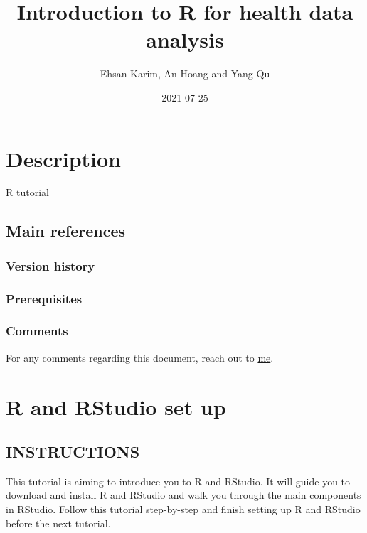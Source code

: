 \documentclass[
]{book}
\title{Introduction to R for health data analysis}
\author{Ehsan Karim, An Hoang and Yang Qu}
\date{2021-07-25}
\begin{document}
\maketitle

{
\setcounter{tocdepth}{1}
\tableofcontents
}
\hypertarget{description}{%
\chapter{Description}\label{description}}

R tutorial

\hypertarget{main-references}{%
\section{Main references}\label{main-references}}

\hypertarget{version-history}{%
\subsection{Version history}\label{version-history}}

\hypertarget{prerequisites}{%
\subsection{Prerequisites}\label{prerequisites}}

\hypertarget{comments}{%
\subsection{Comments}\label{comments}}

For any comments regarding this document, reach out to \href{http://ehsank.com/}{me}.

\hypertarget{r-and-rstudio-set-up}{%
\chapter{R and RStudio set up}\label{r-and-rstudio-set-up}}

\hypertarget{instructions}{%
\section{INSTRUCTIONS}\label{instructions}}

This tutorial is aiming to introduce you to R and RStudio. It will guide you to download and install R and RStudio and walk you through the main components in RStudio. Follow this tutorial step-by-step and finish setting up R and RStudio before the next tutorial.
\end{document}
